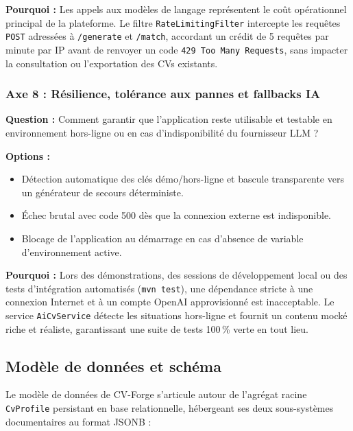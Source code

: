 \documentclass[11pt,a4paper]{article}
\begin{document}
\textbf{Pourquoi :} Les appels aux modèles de langage représentent le coût opérationnel principal de la plateforme. Le filtre \texttt{RateLimitingFilter} intercepte les requêtes \texttt{POST} adressées à \texttt{/generate} et \texttt{/match}, accordant un crédit de 5 requêtes par minute par IP avant de renvoyer un code \texttt{429 Too Many Requests}, sans impacter la consultation ou l'exportation des CVs existants.

\subsubsection{Axe 8 : Résilience, tolérance aux pannes et fallbacks IA}
\textbf{Question :} Comment garantir que l'application reste utilisable et testable en environnement hors-ligne ou en cas d'indisponibilité du fournisseur LLM ?

\textbf{Options :}
\begin{itemize}
    \item[$\boxtimes$] Détection automatique des clés démo/hors-ligne et bascule transparente vers un générateur de secours déterministe.
    \item[$\square$] Échec brutal avec code 500 dès que la connexion externe est indisponible.
    \item[$\square$] Blocage de l'application au démarrage en cas d'absence de variable d'environnement active.
\end{itemize}

\textbf{Pourquoi :} Lors des démonstrations, des sessions de développement local ou des tests d'intégration automatisés (\texttt{mvn test}), une dépendance stricte à une connexion Internet et à un compte OpenAI approvisionné est inacceptable. Le service \texttt{AiCvService} détecte les situations hors-ligne et fournit un contenu mocké riche et réaliste, garantissant une suite de tests 100\,\% verte en tout lieu.

\newpage

\subsection{Modèle de données et schéma}

Le modèle de données de CV-Forge s'articule autour de l'agrégat racine \texttt{CvProfile} persistant en base relationnelle, hébergeant ses deux sous-systèmes documentaires au format JSONB :
\end{document}
